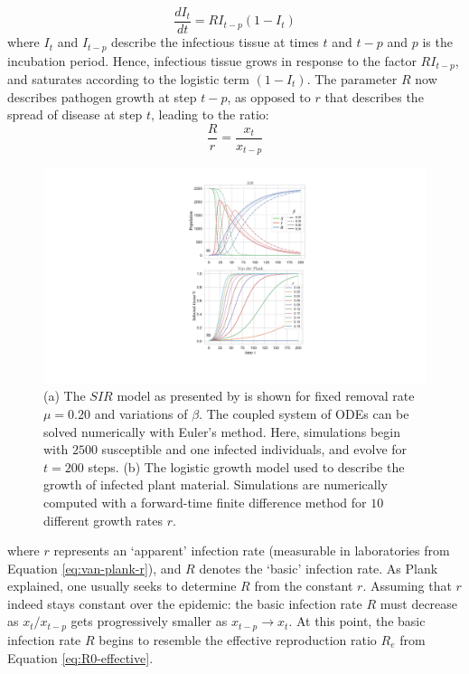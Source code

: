 \begin{equation}
\label{van-plank-incubation}
    \frac{dI_t}{dt} = RI_{t-p}(1 - I_{t})
\end{equation}
where $I_t$ and $I_{t-p}$ describe the infectious tissue at times $t$ and $t-p$ and $p$ is the incubation period. 
Hence, infectious tissue grows in response to the factor $R I_{t-p}$, and saturates
according to the logistic term $(1 - I_t)$. The parameter $R$ now describes pathogen
growth at step $t-p$, as opposed to $r$ that describes the spread of disease at step $t$, leading to the ratio:
\begin{equation}
    \frac{R}{r} = \frac{x_t}{x_{t-p}}
\end{equation}
\begin{figure}
     \centering
     \includegraphics[scale=0.55]{chapter2/figures/SIR-vs-Plank.pdf}
     \caption{(a) The $SIR$ model as presented by \cite{kermack-model} is shown for fixed removal rate $\mu = 0.20$ and variations of $\beta$. 
                  The coupled system of ODEs can be solved numerically with Euler's method. Here, simulations begin with 
                  $2500$ susceptible and one infected individuals, and evolve for $t=200$ steps.
                  (b) The logistic growth model \cite{van2013plant} used to describe the growth of infected plant material.
                  Simulations are numerically computed with a forward-time finite difference method for $10$ different growth rates $r$.
       } 
     \label{fig:SIR-vs-plank}
 \end{figure}
where $r$ represents an `apparent' infection rate (measurable in laboratories from Equation \ref{eq:van-plank-r}),
and $R$ denotes the `basic' infection rate. As Plank explained, one usually seeks
to determine $R$ from the constant $r$. Assuming that $r$ indeed stays constant over the epidemic:
the basic infection rate $R$ must decrease as $x_t/x_{t-p}$ gets progressively smaller as $x_{t-p}\rightarrow x_t $.
At this point, the basic infection rate $R$ begins to resemble the effective reproduction ratio $R_e$
from Equation \ref{eq:R0-effective}. 

